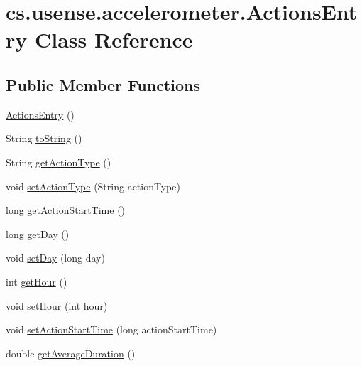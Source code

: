\hypertarget{classcs_1_1usense_1_1accelerometer_1_1_actions_entry}{}\section{cs.\+usense.\+accelerometer.\+Actions\+Entry Class Reference}
\label{classcs_1_1usense_1_1accelerometer_1_1_actions_entry}
\subsection*{Public Member Functions}
\begin{DoxyCompactItemize}
\item 
\hyperlink{classcs_1_1usense_1_1accelerometer_1_1_actions_entry_afe4382a74fc44552648f36567e4cc830}{Actions\+Entry} ()
\item 
String \hyperlink{classcs_1_1usense_1_1accelerometer_1_1_actions_entry_a2baf46f7d903bdd6d3720cc09a16588a}{to\+String} ()
\item 
String \hyperlink{classcs_1_1usense_1_1accelerometer_1_1_actions_entry_ad568c795ef01b9ca445a1f90b1034c4b}{get\+Action\+Type} ()
\item 
void \hyperlink{classcs_1_1usense_1_1accelerometer_1_1_actions_entry_a8a09d200a7928c8ae0af6ae77937c505}{set\+Action\+Type} (String action\+Type)
\item 
long \hyperlink{classcs_1_1usense_1_1accelerometer_1_1_actions_entry_afdd3fc12eafa6bd682d3113ef46447a1}{get\+Action\+Start\+Time} ()
\item 
long \hyperlink{classcs_1_1usense_1_1accelerometer_1_1_actions_entry_a5041b6dfffb0bceb0989311eeae18f9a}{get\+Day} ()
\item 
void \hyperlink{classcs_1_1usense_1_1accelerometer_1_1_actions_entry_ad4d86c0c3046b6eb7b520b782b96b803}{set\+Day} (long day)
\item 
int \hyperlink{classcs_1_1usense_1_1accelerometer_1_1_actions_entry_a58163f73e3fbcb4f0ce385e8ccafe651}{get\+Hour} ()
\item 
void \hyperlink{classcs_1_1usense_1_1accelerometer_1_1_actions_entry_a511ec36a42c0ba0d4a304d1a75e6ce0c}{set\+Hour} (int hour)
\item 
void \hyperlink{classcs_1_1usense_1_1accelerometer_1_1_actions_entry_a4951087a8d84cf432af9600b43a9738d}{set\+Action\+Start\+Time} (long action\+Start\+Time)
\item 
double \hyperlink{classcs_1_1usense_1_1accelerometer_1_1_actions_entry_aed3c13652b52d53a6cf8a8d96e2dd748}{get\+Average\+Duration} ()

\end{DoxyCompactItemize}
